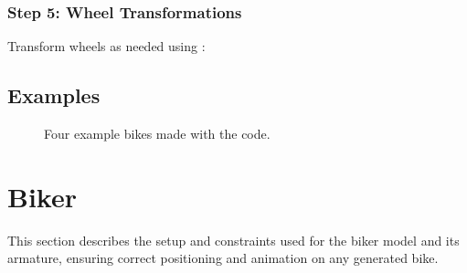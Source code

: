 \documentclass[letterpaper,10pt,english]{jupyterBook}
\begin{document}
\subsubsection{Step 5: Wheel Transformations}
\label{\detokenize{Edit Script:step-5-wheel-transformations}}
\sphinxAtStartPar
Transform wheels as needed using :

\begin{sphinxVerbatim}[commandchars=\\\{\}]
     
     

       
       
\end{sphinxVerbatim}


\subsection{Examples}
\label{\detokenize{Edit Script:examples}}
\begin{figure}[htbp]
\centering
\capstart

\noindent{}
\caption{Four example bikes made with the code.}\label{\detokenize{Edit Script:id1}}\end{figure}

\sphinxstepscope


\section{Biker}
\label{\detokenize{Biker:biker}}\label{\detokenize{Biker::doc}}
\sphinxAtStartPar
This section describes the setup and constraints used for the biker model and its armature, ensuring correct positioning and animation on any generated bike.
\end{document}
